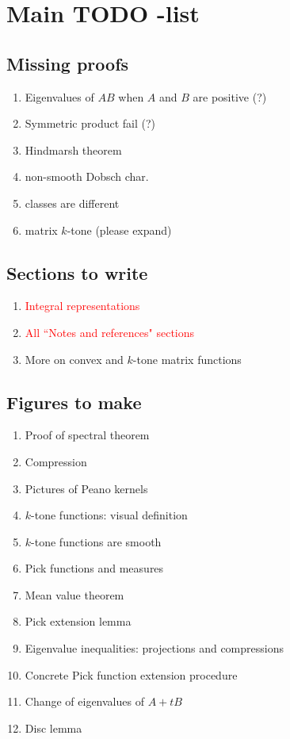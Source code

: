 \section{Main TODO -list}
\subsection{Missing proofs}
\begin{enumerate}
	\item Eigenvalues of $AB$ when $A$ and $B$ are positive (?)
	\item Symmetric product fail (?)
	\item Hindmarsh theorem
	\item non-smooth Dobsch char.
	\item classes are different
	\item matrix $k$-tone (please expand)
\end{enumerate}

\subsection{Sections to write}
\begin{enumerate}
	\item \textcolor{red}{Integral representations}
	\item \textcolor{red}{All ``Notes and references" sections}
	\item More on convex and $k$-tone matrix functions
\end{enumerate}

\subsection{Figures to make}
\begin{enumerate}
	\item Proof of spectral theorem
	\item Compression
	\item Pictures of Peano kernels
	\item $k$-tone functions: visual definition
	\item $k$-tone functions are smooth
	\item Pick functions and measures
	\item Mean value theorem
	\item Pick extension lemma
	\item Eigenvalue inequalities: projections and compressions
	\item Concrete Pick function extension procedure
	\item Change of eigenvalues of $A + t B$
	\item Disc lemma
\end{enumerate}


